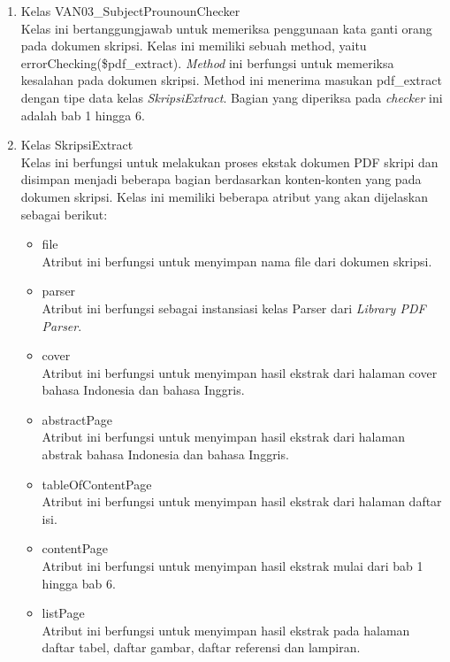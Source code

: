 \begin{enumerate}
	\item Kelas VAN03\_SubjectProunounChecker \\
	Kelas ini bertanggungjawab untuk memeriksa penggunaan kata ganti orang pada dokumen skripsi. Kelas ini memiliki sebuah method, yaitu errorChecking(\$pdf\_extract). \textit{Method} ini berfungsi untuk memeriksa kesalahan pada dokumen skripsi. Method ini menerima masukan pdf\_extract dengan tipe data kelas \textit{SkripsiExtract}. Bagian yang diperiksa pada \textit{checker} ini adalah bab 1 hingga 6.
			
	\item Kelas SkripsiExtract \\
	Kelas ini berfungsi untuk melakukan proses ekstak dokumen PDF skripi dan disimpan menjadi beberapa bagian berdasarkan konten-konten yang pada dokumen skripsi. Kelas ini memiliki beberapa atribut yang akan dijelaskan sebagai berikut:
	
		\begin{itemize}
			\item file \\
			Atribut ini berfungsi untuk menyimpan nama file dari dokumen skripsi.
			
			\item parser \\			
			Atribut ini berfungsi sebagai instansiasi kelas Parser dari \textit{Library PDF Parser}.
			
			\item cover \\
			Atribut ini berfungsi untuk menyimpan hasil ekstrak dari halaman cover bahasa Indonesia dan bahasa Inggris.
			
			\item abstractPage \\			
			Atribut ini berfungsi untuk menyimpan hasil ekstrak dari halaman abstrak bahasa Indonesia dan bahasa Inggris.
			
			\item tableOfContentPage \\
			Atribut ini berfungsi untuk menyimpan hasil ekstrak dari halaman daftar isi.
			
			\item contentPage \\	
			Atribut ini berfungsi untuk menyimpan hasil ekstrak mulai dari bab 1 hingga bab 6.
			
			\item listPage \\
			Atribut ini berfungsi untuk menyimpan hasil ekstrak pada halaman daftar tabel, daftar gambar, daftar referensi dan lampiran.
			

\end{itemize}
\end{enumerate}
